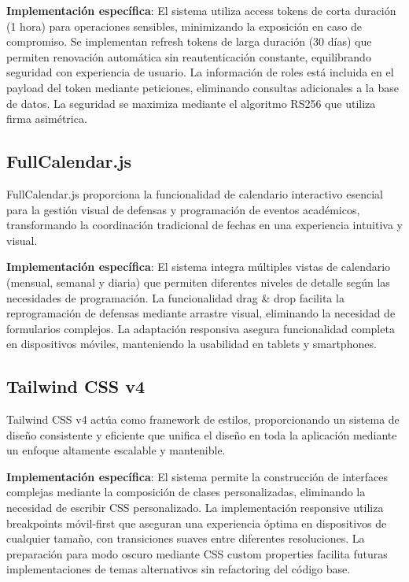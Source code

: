 \documentclass[12pt,a4paper,oneside]{report}
\begin{document}
\textbf{Implementación específica}: El sistema utiliza access tokens de corta duración (1 hora) para operaciones sensibles, minimizando la exposición en caso de compromiso. Se implementan refresh tokens de larga duración (30 días) que permiten renovación automática sin reautenticación constante, equilibrando seguridad con experiencia de usuario. La información de roles está incluida en el payload del token mediante peticiones, eliminando consultas adicionales a la base de datos. La seguridad se maximiza mediante el algoritmo RS256 que utiliza firma asimétrica.

\subsection{FullCalendar.js}\label{fullcalendar.js}

FullCalendar.js proporciona la funcionalidad de calendario interactivo esencial para la gestión visual de defensas y programación de eventos académicos, transformando la coordinación tradicional de fechas en una experiencia intuitiva y visual.

\textbf{Implementación específica}: El sistema integra múltiples vistas de calendario (mensual, semanal y diaria) que permiten diferentes niveles de detalle según las necesidades de programación. La funcionalidad drag \& drop facilita la reprogramación de defensas mediante arrastre visual, eliminando la necesidad de formularios complejos. La adaptación responsiva asegura funcionalidad completa en dispositivos móviles, manteniendo la usabilidad en tablets y smartphones.

\subsection{Tailwind CSS v4}\label{tailwind-css-v4}

Tailwind CSS v4 actúa como framework de estilos, proporcionando un sistema de diseño consistente y eficiente que unifica el diseño en toda la aplicación mediante un enfoque altamente escalable y mantenible.

\textbf{Implementación específica}: El sistema permite la construcción de interfaces complejas mediante la composición de clases personalizadas, eliminando la necesidad de escribir CSS personalizado. La implementación responsive utiliza breakpoints móvil-first que aseguran una experiencia óptima en dispositivos de cualquier tamaño, con transiciones suaves entre diferentes resoluciones. La preparación para modo oscuro mediante CSS custom properties facilita futuras implementaciones de temas alternativos sin refactoring del código base.
\end{document}
